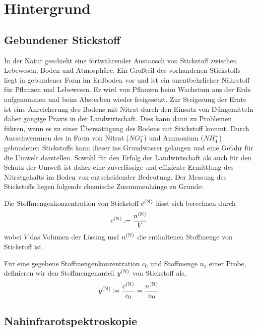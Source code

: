 \section{Hintergrund}
\label{sec:Hintergrund}

	\subsection{Gebundener Stickstoff}
	\label{ssec:Gebundener Stickstoff}

	In der Natur geschieht eine fortwährender Austausch von Stickstoff zwischen Lebewesen, Boden und Atmosphäre.
	Ein Großteil des vorhandenen Stickstoffs liegt in gebundener Form im Erdboden vor und ist ein unentbehrlicher Nährstoff für Pflanzen und Lebewesen.
	Er wird von Pflanzen beim Wachstum aus der Erde aufgenommen und beim Absterben wieder freigesetzt.
    Zur Steigerung der Ernte ist eine Anreicherung des Bodens mit Nitrat durch den Einsatz von Düngemitteln daher gängige Praxis in der Landwirtschaft.\cite{Umweltbundesamt2017}
    Dies kann dann zu Problemen führen, wenn es zu einer Übersättigung des Bodens mit Stickstoff kommt.
    Durch Ausschwemmen des in Form von Nitrat ($NO_3^-$) und Ammonium ($NH_4^+$) gebundenen Stickstoffs kann dieser ins Grundwasser gelangen und eine Gefahr für die Umwelt darstellen.
    Sowohl für den Erfolg der Landwirtschaft als auch für den Schutz der Umwelt ist daher eine zuverlässige und effiziente Ermittlung des Nitratgehalts im Boden von entscheidender Bedeutung.
    Der Messung des Stickstoffs liegen folgende chemische Zusammenhänge zu Grunde:


    Die Stoffmengenkonzentration von Stickstoff $c^{\mathrm{(N)}}$ lässt sich berechnen durch
    	\[
			c^{\mathrm{(N)}} \coloneqq \frac{n^{\mathrm{(N)}}}{V}
		\]
		wobei $V$ das Volumen der Lösung und $n^{\mathrm{(N)}}$ die enthaltenen Stoffmenge von Stickstoff ist.

    Für eine gegebene Stoffmengenkonzentration $c_0$ und Stoffmenge $n_o$ einer Probe, definieren wir den Stoffmengenanteil $y^{\mathrm{(N)}}$ von Stickstoff als,
        \[
			y^{\mathrm{(N)}} \coloneqq \frac{c^{\mathrm{(N)}}}{c_0} = \frac{n^{\mathrm{(N)}}}{n_0}
		\]


	\subsection{Nahinfrarotspektroskopie}
	\label{ssec:Nahinfrarotspek}

